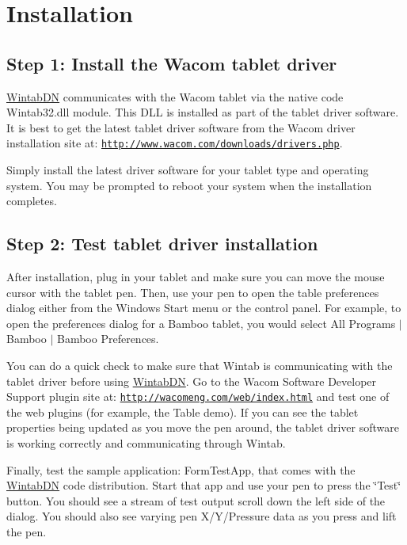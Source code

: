 \hypertarget{page1_install_sec}{}\section{Installation}\label{page1_install_sec}
\hypertarget{page1_step1}{}\subsection{Step 1: Install the Wacom tablet driver}\label{page1_step1}
\hyperlink{namespace_wintab_d_n}{WintabDN} communicates with the Wacom tablet via the native code Wintab32.dll module. This DLL is installed as part of the tablet driver software. It is best to get the latest tablet driver software from the Wacom driver installation site at: \href{http://www.wacom.com/downloads/drivers.php}{\tt http://www.wacom.com/downloads/drivers.php}.

Simply install the latest driver software for your tablet type and operating system. You may be prompted to reboot your system when the installation completes.\hypertarget{page1_step2}{}\subsection{Step 2: Test tablet driver installation}\label{page1_step2}
After installation, plug in your tablet and make sure you can move the mouse cursor with the tablet pen. Then, use your pen to open the table preferences dialog either from the Windows Start menu or the control panel. For example, to open the preferences dialog for a Bamboo tablet, you would select All Programs $|$ Bamboo $|$ Bamboo Preferences.

You can do a quick check to make sure that Wintab is communicating with the tablet driver before using \hyperlink{namespace_wintab_d_n}{WintabDN}. Go to the Wacom Software Developer Support plugin site at: \href{http://wacomeng.com/web/index.html}{\tt http://wacomeng.com/web/index.html} and test one of the web plugins (for example, the Table demo). If you can see the tablet properties being updated as you move the pen around, the tablet driver software is working correctly and communicating through Wintab.

Finally, test the sample application: FormTestApp, that comes with the \hyperlink{namespace_wintab_d_n}{WintabDN} code distribution. Start that app and use your pen to press the \char`\"{}Test\char`\"{} button. You should see a stream of test output scroll down the left side of the dialog. You should also see varying pen X/Y/Pressure data as you press and lift the pen.

